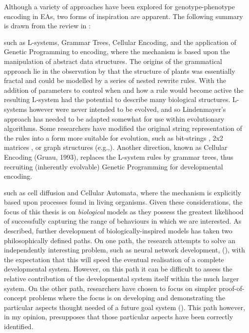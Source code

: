 Although a variety of approaches have been explored for genotype-phenotype encoding in EAs, two forms of inspiration are apparent. The following summary is drawn from the review in \textcite{Stanley:2003fh}:

 such as L-systems, Grammar Trees, Cellular Encoding, and the application of Genetic Programming to encoding, where the mechanism is based upon the manipulation of abstract data structures. The origins of the grammatical approach lie in the observation by \textcite{Lindenmayer:1968nl} that the structure of plants was essentially fractal and could be modelled by a series of nested rewrite rules. With the addition of parameters to control when and how a rule would become active the resulting L-system had the potential to describe many biological structures. L-systems however were never intended to be evolved, and so Lindenmayer's approach has needed to be adapted somewhat for use within evolutionary algorithms. Some researchers have modified the original string representation of the rules into a form more suitable for evolution, such as bit-strings \parencite{Boers:1992cn}, 2x2 matrices \parencite{Kitano:1990fs}, or graph structures (e.g.,\cite{Sims:1994uq}). Another direction, known as Cellular Encoding (Gruau, 1993), replaces the L-system rules by grammar trees, thus recruiting (inherently evolvable) Genetic Programming for developmental encoding.

 such as cell diffusion and Cellular Automata, where the mechanism is explicitly based upon processes found in living organisms. Given these considerations, the focus of this thesis is on \emph{biological} models as they possess the greatest likelihood of successfully capturing the range of behaviours in which we are interested. As \textcite{Stanley:2003fh} described, further development of biologically-inspired models has taken two philosophically defined paths. On one path, the research attempts to solve an independently interesting problem, such as neural network development, (\eg \cite{Bongard:2003tf}), with the expectation that this will speed the eventual realisation of a complete developmental system. However, on this path it can be difficult to assess the relative contribution of the developmental system itself within the much larger system. On the other path, researchers have chosen to focus on simpler proof-of-concept problems where the focus is on developing and demonstrating the particular aspects thought needed of a future goal system (\eg \cite{Bentley:1999zr,Roggen:2007kl}). This path however, in my opinion, presupposes that those particular aspects have been correctly identified.

